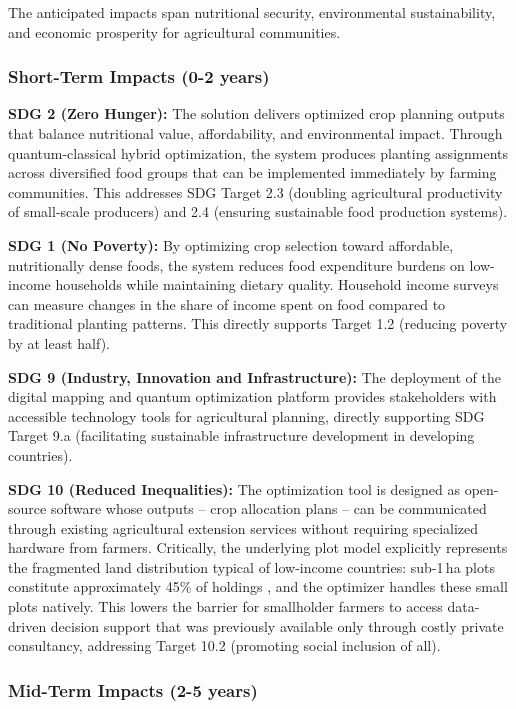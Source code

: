 \documentclass{oqireport}
\begin{document}
The anticipated impacts span nutritional security, environmental sustainability, and economic prosperity for agricultural communities.

\subsubsection{Short-Term Impacts (0-2 years)}

\textbf{SDG 2 (Zero Hunger):} The solution delivers optimized crop planning outputs that balance nutritional value, affordability, and environmental impact. Through quantum-classical hybrid optimization, the system produces planting assignments across diversified food groups that can be implemented immediately by farming communities. This addresses SDG Target 2.3 (doubling agricultural productivity of small-scale producers) and 2.4 (ensuring sustainable food production systems).

\textbf{SDG 1 (No Poverty):} By optimizing crop selection toward affordable, nutritionally dense foods, the system reduces food expenditure burdens on low-income households while maintaining dietary quality. Household income surveys can measure changes in the share of income spent on food compared to traditional planting patterns. This directly supports Target 1.2 (reducing poverty by at least half).

\textbf{SDG 9 (Industry, Innovation and Infrastructure):} The deployment of the digital mapping and quantum optimization platform provides stakeholders with accessible technology tools for agricultural planning, directly supporting SDG Target 9.a (facilitating sustainable infrastructure development in developing countries).

\textbf{SDG 10 (Reduced Inequalities):} The optimization tool is designed as open-source software whose outputs -- crop allocation plans -- can be communicated through existing agricultural extension services without requiring specialized hardware from farmers. Critically, the underlying plot model explicitly represents the fragmented land distribution typical of low-income countries: sub-1\,ha plots constitute approximately 45\% of holdings \cite{lowder2016number}, and the optimizer handles these small plots natively. This lowers the barrier for smallholder farmers to access data-driven decision support that was previously available only through costly private consultancy, addressing Target 10.2 (promoting social inclusion of all).

\subsubsection{Mid-Term Impacts (2-5 years)}
\end{document}
